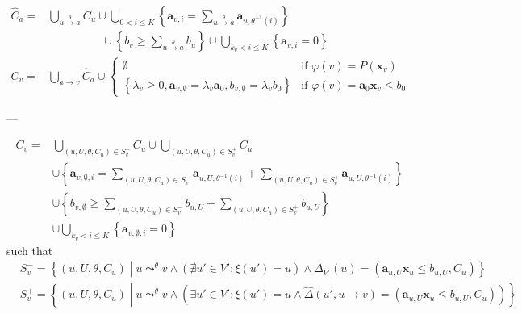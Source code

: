 \documentclass[a4paper,12pt]{article}
\newcommand{\edge}[2]{#1\rightarrow#2}
\newcommand{\edgel}[3]{#1\xrightarrow{#2}#3}
\begin{document}
\begin{align*}
\hat C_a = &
 \bigcup_{\edgel{u}{\theta}{a}} C_u \cup
 \bigcup_{0 < i \leq K}
 \left\lbrace
  \mathbf{a}_{v,i} = \sum_{\edgel{u}{\theta}{a}} \mathbf{a}_{u, \theta^{-1} (i)}
 \right\rbrace \\
 & \hspace{2cm} \cup
 \left\lbrace
  b_v \geq \sum_{\edgel{u}{\theta}{a}} b_u
 \right\rbrace \cup
 \bigcup_{k_v < i \leq K}
 \left\lbrace \mathbf{a}_{v,i} = 0 \right\rbrace
\\
C_v = & \bigcup_{\edge{a}{v}} \hat C_a \cup
\begin{cases}
\emptyset
& \mbox{if } \varphi(v) = P(\mathbf{x}_v) \\
\left\lbrace
 \lambda_v \geq 0, \mathbf{a}_{v,\emptyset} = \lambda_v \mathbf{a}_0,
 b_{v,\emptyset} = \lambda_v b_0
\right\rbrace
& \mbox{if } \varphi(v) = \mathbf{a}_0 \mathbf{x}_v \leq b_0
\end{cases}
\end{align*}

---

\begin{align*}
C_v = & \bigcup_{(u,U,\theta,C_u) \in S_v^-} C_u \cup
\bigcup_{(u,U,\theta,C_u) \in S_v^+} C_u
\\
& \cup
\left\lbrace
 \mathbf{a}_{v,\emptyset,i} =
  \sum_{(u,U,\theta,C_u) \in S_v^-} \mathbf{a}_{u,U,\theta^{-1}(i)} +
  \sum_{(u,U,\theta,C_u) \in S_v^+} \mathbf{a}_{u,U, \theta^{-1}(i)}
\right\rbrace \\
& \cup \left\lbrace
 b_{v,\emptyset} \geq
  \sum_{(u,U,\theta,C_u) \in S_v^-} b_{u,U} +
  \sum_{(u,U,\theta,C_u) \in S_v^+} b_{u,U}
\right\rbrace \\
& \cup \bigcup_{k_v < i \leq K} \left\lbrace \mathbf{a}_{v,\emptyset,i} = 0 \right\rbrace
\end{align*}
such that
\begin{align*}
& S_v^- = \left\lbrace (u, U, \theta, C_u) \middle|
  u \mathop{\leadsto}^\theta v \wedge
  \left( \nexists u' \in V'; \xi (u') = u \right) \wedge
  \Delta_{V'} (u) = (\mathbf{a}_{u,U} \mathbf{x}_u \leq b_{u,U}, C_u) \right\rbrace
\\
& S_v^+ = \left\lbrace (u, U, \theta, C_u) \middle|
  u \mathop{\leadsto}^\theta v \wedge
  \left( \exists u' \in V'; \xi (u') = u \wedge
  \hat \Delta (u', \edge{u}{v}) = (\mathbf{a}_{u,U} \mathbf{x}_u \leq b_{u,U}, C_u) \right) \right\rbrace
\\
\end{align*}
\end{document}
